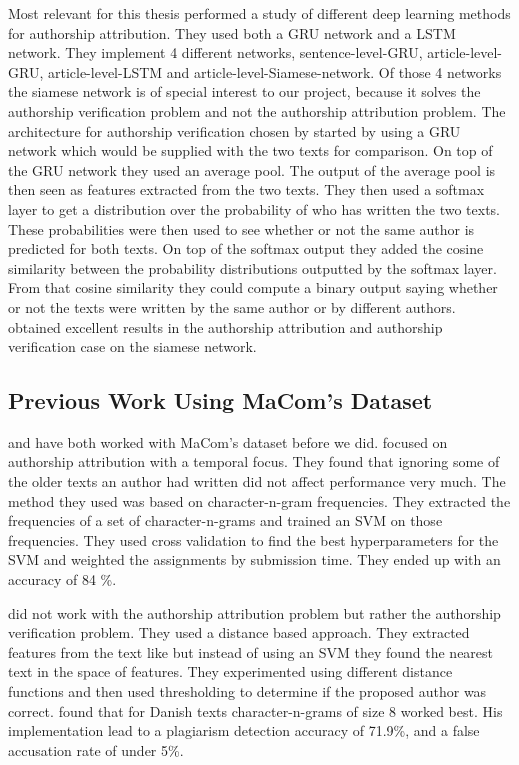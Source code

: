 Most relevant for this thesis \citet{qian:2018} performed a study of different
deep learning methods for authorship attribution. They used both a \gls{GRU}
network and a \gls{LSTM} network. They implement 4 different networks,
sentence-level-\gls{GRU}, article-level-\gls{GRU}, article-level-\gls{LSTM} and
article-level-Siamese-network. Of those 4 networks the siamese network is of
special interest to our project, because it solves the authorship verification
problem and not the authorship attribution problem. The architecture for
authorship verification chosen by \citet{qian:2018} started by using a \gls{GRU}
network which would be supplied with the two texts for comparison. On top of
the \gls{GRU} network they used an average pool. The output of the average pool
is then seen as features extracted from the two texts. They then used a softmax
layer to get a distribution over the probability of who has written the two
texts. These probabilities were then used to see whether or not the same author
is predicted for both texts. On top of the softmax output they added the cosine
similarity between the probability distributions outputted by the softmax layer.
From that cosine similarity they could compute a binary output saying whether
or not the texts were written by the same author or by different authors.
\citet{qian:2018} obtained excellent results in the authorship attribution and
authorship verification case on the siamese network.


\subsection{Previous Work Using MaCom's Dataset}
\label{subsec:previous_work_using_macoms_dataset}

\citet{hansen2014} and \citet{aalykke2016} have both worked with MaCom's dataset
before we did. \citet{hansen2014} focused on authorship attribution with a
temporal focus. They found that ignoring some of the older texts an author had
written did not affect performance very much. The method they used was based
on character-n-gram frequencies. They extracted the frequencies of a set of
character-n-grams and trained an \gls{SVM} on those frequencies. They used cross
validation to find the best hyperparameters for the \gls{SVM} and weighted the
assignments by submission time. They ended up with an accuracy of 84 \%.

\citet{aalykke2016} did not work with the authorship attribution problem but
rather the authorship verification problem. They used a distance based approach.
They extracted features from the text like \citet{hansen2014} but instead of
using an \gls{SVM} they found the nearest text in the space of features. They
experimented using different distance functions and then used thresholding to
determine if the proposed author was correct. \citet{aalykke2016} found that for
Danish texts character-n-grams of size 8 worked best. His implementation lead to
a plagiarism detection accuracy of 71.9\%, and a false accusation rate of under
5\%.

